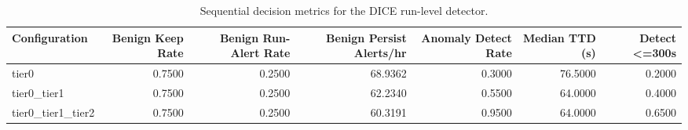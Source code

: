 \begin{table}[t]
\centering
\caption{Sequential decision metrics for the DICE run-level detector.}
\label{tab:dice_sequential_metrics}
\footnotesize
\begin{tabular}{lrrrrrr}
\toprule
Configuration & Benign Keep Rate & Benign Run-Alert Rate & Benign Persist Alerts/hr & Anomaly Detect Rate & Median TTD (s) & Detect <=300s \\
\midrule
tier0 & 0.7500 & 0.2500 & 68.9362 & 0.3000 & 76.5000 & 0.2000 \\
tier0_tier1 & 0.7500 & 0.2500 & 62.2340 & 0.5500 & 64.0000 & 0.4000 \\
tier0_tier1_tier2 & 0.7500 & 0.2500 & 60.3191 & 0.9500 & 64.0000 & 0.6500 \\
\bottomrule
\end{tabular}

\end{table}

